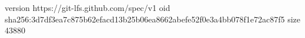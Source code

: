 version https://git-lfs.github.com/spec/v1
oid sha256:3d7df3ea7c875b62efacd13b25b06ea8662abefe52f0e3a4bb078f1e72ac87f5
size 43880
